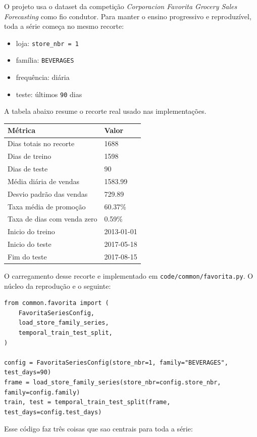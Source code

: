 \documentclass[12pt]{article}
\providecommand{\tightlist}{%
  \setlength{\itemsep}{0pt}\setlength{\parskip}{0pt}}
\begin{document}
O projeto usa o dataset da competição \emph{Corporacion Favorita Grocery Sales Forecasting} como fio condutor. Para manter o ensino progressivo e reproduzível, toda a série começa no mesmo recorte:

\begin{itemize}
\tightlist
\item
  loja: \texttt{store\_nbr\ =\ 1}
\item
  família: \texttt{BEVERAGES}
\item
  frequência: diária
\item
  teste: últimos \texttt{90} dias
\end{itemize}

A tabela abaixo resume o recorte real usado nas implementações.

\begin{longtable}[]{@{}ll@{}}
\toprule\noalign{}
Métrica & Valor \\
\midrule\noalign{}
\endhead
\bottomrule\noalign{}
\endlastfoot
Dias totais no recorte & 1688 \\
Dias de treino & 1598 \\
Dias de teste & 90 \\
Média diária de vendas & 1583.99 \\
Desvio padrão das vendas & 729.89 \\
Taxa média de promoção & 60.37\% \\
Taxa de dias com venda zero & 0.59\% \\
Inicio do treino & 2013-01-01 \\
Inicio do teste & 2017-05-18 \\
Fim do teste & 2017-08-15 \\
\end{longtable}

O carregamento desse recorte e implementado em \texttt{code/common/favorita.py}. O núcleo da reprodução e o seguinte:

\begin{verbatim}
from common.favorita import (
    FavoritaSeriesConfig,
    load_store_family_series,
    temporal_train_test_split,
)

config = FavoritaSeriesConfig(store_nbr=1, family="BEVERAGES", test_days=90)
frame = load_store_family_series(store_nbr=config.store_nbr, family=config.family)
train, test = temporal_train_test_split(frame, test_days=config.test_days)
\end{verbatim}

Esse código faz três coisas que sao centrais para toda a série:
\end{document}
